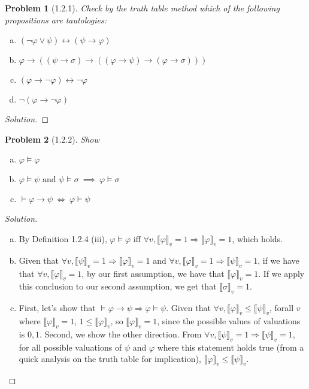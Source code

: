 \documentclass[letter]{article}
\newtheorem{problem}{Problem}
\theoremstyle{definition}
\newenvironment{solution}
{\begin{proof}[Solution]}
        {\end{proof}}
\renewcommand{\phi}{\varphi}
\begin{document}
\begin{problem}[1.2.1] Check by the truth table method which of the following propositions are tautologies:
    \begin{enumerate}[(a)]
        \item $(\neg \phi \lor \psi) \leftrightarrow (\psi \to \phi)$
        \item $\phi \to ((\psi \to \sigma)
                          \to
                          ((\phi \to \psi)
                            \to (\phi \to \sigma)
                            ))$
        \item $(\phi \to \neg \phi) \leftrightarrow \neg \phi$
        \item $\neg (\phi \to \neg \phi)$
    \end{enumerate}
\end{problem}
\begin{solution}
\end{solution}
\newcommand{\den}[1]{\llbracket #1 \rrbracket_v}
\begin{problem}[1.2.2] Show
    \begin{enumerate}[(a)]
        \item $\phi \models \phi$
        \item $\phi \models \psi \textrm{ and } \psi \models \sigma \> \implies \> \phi \models \sigma$
        \item $\models \phi \to \psi \> \iff \> \phi \models \psi$
    \end{enumerate}
\end{problem}
\begin{solution}
  \begin{enumerate}[(a)]
    \item By Definition 1.2.4 (iii), $\phi \models \phi$ iff $\forall v, \den {\phi} = 1
    \Rightarrow \den{\phi} = 1$, which holds.
    \item Given that $\forall v, \den{\psi} = 1 \Rightarrow \den{\phi} = 1$ and
    $\forall v, \den{\phi} = 1 \Rightarrow \den{\psi} = 1$, if we have that $\forall v, \den{\phi} = 1$,
    by our first assumption, we have that $\den{\phi} = 1$. If we apply this conclusion to our second
    assumption, we get that $\den{\sigma} = 1$.
    \item First, let's show that $\models \phi \to \psi \Rightarrow \phi \models \psi$.
    Given that $\forall v, \den{\phi} \leq \den{\psi}$, forall $v$ where $\den{\phi} = 1$,
    $1 \leq \den{\phi}$, so $\den{\phi} = 1$, since the possible values of valuations is ${0,1}$.
    Second, we show the other direction. From $\forall v, \den{\psi} = 1 \Rightarrow \den{\psi} = 1$,
    for all possible valuations of $\psi$ and $\phi$ where this statement holds true (from a quick analysis
    on the truth table for implication), $\den{\phi} \leq \den{\psi}$.
  \end{enumerate}

\end{solution}
\end{document}
